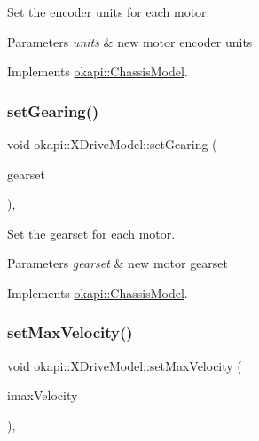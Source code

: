 Set the encoder units for each motor.


\begin{DoxyParams}{Parameters}
{\em units} & new motor encoder units \\
\hline
\end{DoxyParams}


Implements \mbox{\hyperlink{classokapi_1_1ChassisModel_ae8ba9a72bf827af4c6feffaac99b33ee}{okapi\+::\+Chassis\+Model}}.

\mbox{\label{classokapi_1_1XDriveModel_ae9205c16e581786fecabaeb5066edab6}} 
\subsubsection{\texorpdfstring{setGearing()}{setGearing()}}
{\footnotesize\ttfamily void okapi\+::\+X\+Drive\+Model\+::set\+Gearing (\begin{DoxyParamCaption}\item[{\mbox{\hyperlink{classokapi_1_1AbstractMotor_a88aaa6ea2fa10f5520a537bbf26774d5}{Abstract\+Motor\+::gearset}}}]{gearset }\end{DoxyParamCaption})\hspace{0.3cm}{\ttfamily [override]}, {\ttfamily [virtual]}}

Set the gearset for each motor.


\begin{DoxyParams}{Parameters}
{\em gearset} & new motor gearset \\
\hline
\end{DoxyParams}


Implements \mbox{\hyperlink{classokapi_1_1ChassisModel_a960d6ce2f21e5832fce1d7566408cb61}{okapi\+::\+Chassis\+Model}}.

\mbox{\label{classokapi_1_1XDriveModel_aec91f0569213bbca770ad4a25529beb6}} 
\subsubsection{\texorpdfstring{setMaxVelocity()}{setMaxVelocity()}}
{\footnotesize\ttfamily void okapi\+::\+X\+Drive\+Model\+::set\+Max\+Velocity (\begin{DoxyParamCaption}\item[{double}]{imax\+Velocity }\end{DoxyParamCaption})\hspace{0.3cm}{\ttfamily [override]}, {\ttfamily [virtual]}}

